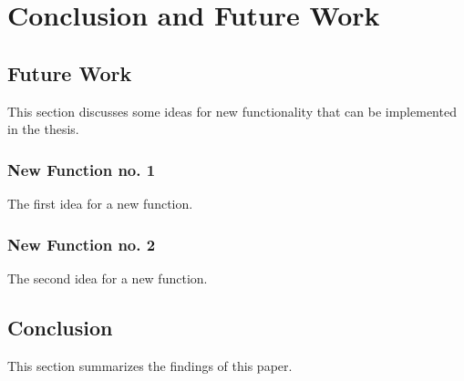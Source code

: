 
\chapter{Conclusion and Future Work} %

\label{Chapter3} %



\section{Future Work}

This section discusses some ideas for new functionality that can be implemented in the thesis.

\subsection{New Function no. 1}

The first idea for a new function.

\subsection{New Function no. 2}

The second idea for a new function.


\section{Conclusion}

This section summarizes the findings of this paper.